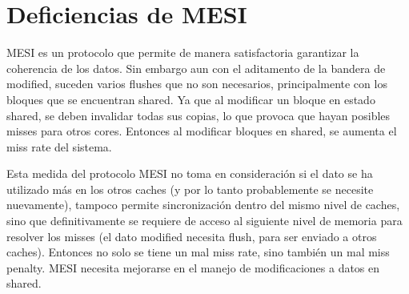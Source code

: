\documentclass {article}
\begin{document}
\section{Deficiencias de MESI}

MESI es un protocolo que permite de manera satisfactoria garantizar la coherencia de los datos. Sin
embargo aun con el aditamento de la bandera de modified, suceden varios flushes que no son
necesarios, principalmente con los bloques que se encuentran shared. Ya que al modificar un bloque
en estado shared, se deben invalidar todas sus copias, lo que provoca que hayan posibles misses para
otros cores. Entonces al modificar bloques en shared, se aumenta el miss rate del sistema. 

Esta medida del protocolo MESI no toma en consideración si el dato se ha utilizado más en los otros
caches (y por lo tanto probablemente se necesite nuevamente), tampoco permite sincronización dentro
del mismo nivel de caches, sino que definitivamente se requiere de acceso al siguiente nivel de
memoria para resolver los misses (el dato modified necesita flush, para ser enviado a otros
caches). Entonces no solo se tiene un mal miss rate, sino también un mal miss penalty. MESI necesita
mejorarse en el manejo de modificaciones a datos en shared.
\end{document}
